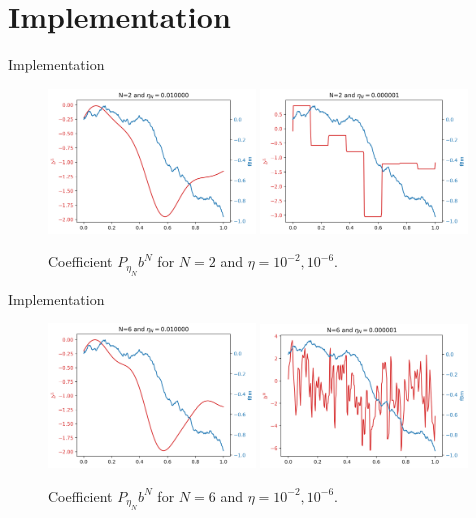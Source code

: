 \documentclass{beamer}
\begin{document}
\section{Implementation}
\begin{frame}{Implementation}
		\begin{figure}
				\includegraphics[width=0.49\textwidth]{bn_n2_eta01}
				\includegraphics[width=0.49\textwidth]{bn_n2_eta501}
				\caption{Coefficient $P_{\eta_{N}}b^{N}$ for $N=2$ and $\eta=10^{-2}, 10^{-6}$.}
		\end{figure}
\end{frame}

\begin{frame}{Implementation}
		\begin{figure}
				\includegraphics[width=0.49\textwidth]{bn_n6_eta01}
				\includegraphics[width=0.49\textwidth]{bn_n6_eta501}
				\caption{Coefficient $P_{\eta_{N}}b^{N}$ for $N=6$ and $\eta=10^{-2}, 10^{-6}$.}
		\end{figure}
\end{frame}
\end{document}
